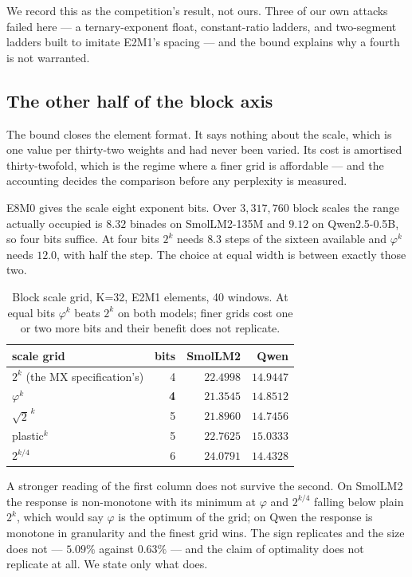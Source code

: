 \documentclass[11pt]{article}
\theoremstyle{definition}
\begin{document}
We record this as the competition's result, not ours. Three of our own attacks
failed here --- a ternary-exponent float, constant-ratio ladders, and
two-segment ladders built to imitate E2M1's spacing --- and the bound explains
why a fourth is not warranted.

\subsection{The other half of the block axis}\label{sec:scaleaxis}

The bound closes the element format. It says nothing about the scale, which is
one value per thirty-two weights and had never been varied. Its cost is
amortised thirty-twofold, which is the regime where a finer grid is affordable
--- and the accounting decides the comparison before any perplexity is measured.

E8M0 gives the scale eight exponent bits. Over $3{,}317{,}760$ block scales the
range actually occupied is $8.32$ binades on SmolLM2-135M and $9.12$ on
Qwen2.5-0.5B, so four bits suffice. At four bits $2^{k}$ needs $8.3$ steps of
the sixteen available and $\varphi^{k}$ needs $12.0$, with half the step. The
choice at equal width is between exactly those two.

\begin{table}[t]\centering
\caption{Block scale grid, K=32, E2M1 elements, 40 windows. At equal bits
$\varphi^{k}$ beats $2^{k}$ on both models; finer grids cost one or two more
bits and their benefit does not replicate.}
\label{tab:scalegrid}
\begin{tabular}{lrrr}
\toprule
scale grid & bits & SmolLM2 & Qwen \\
\midrule
$2^{k}$ (the MX specification's) & 4 & $22.4998$ & $14.9447$ \\
$\varphi^{k}$                    & \textbf{4} & $\mathbf{21.3545}$ & $\mathbf{14.8512}$ \\
$\sqrt{2}^{\,k}$                 & 5 & $21.8960$ & $14.7456$ \\
plastic$^{k}$                    & 5 & $22.7625$ & $15.0333$ \\
$2^{k/4}$                        & 6 & $24.0791$ & $14.4328$ \\
\bottomrule
\end{tabular}
\end{table}

A stronger reading of the first column does not survive the second. On SmolLM2
the response is non-monotone with its minimum at $\varphi$ and $2^{k/4}$ falling
below plain $2^{k}$, which would say $\varphi$ is the optimum of the grid; on
Qwen the response is monotone in granularity and the finest grid wins. The sign
replicates and the size does not --- $5.09\%$ against $0.63\%$ --- and the claim
of optimality does not replicate at all. We state only what does.
\end{document}
